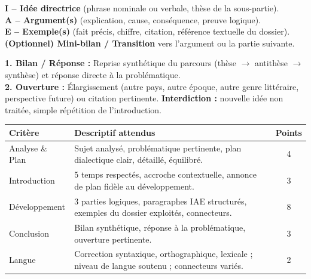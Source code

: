 \documentclass[11pt]{article}
\begin{document}
\begin{definition}
\textbf{I -- Idée directrice} (phrase nominale ou verbale, thèse de la sous-partie). \\
\textbf{A -- Argument(s)} (explication, cause, conséquence, preuve logique). \\
\textbf{E -- Exemple(s)} (fait précis, chiffre, citation, référence textuelle du dossier). \\
\textbf{(Optionnel) Mini-bilan / Transition} vers l'argument ou la partie suivante.
\end{definition}

\begin{definition}
\textbf{1. Bilan / Réponse :} Reprise synthétique du parcours (thèse $\rightarrow$ antithèse $\rightarrow$ synthèse) et réponse directe à la problématique. \\
\textbf{2. Ouverture :} Élargissement (autre pays, autre époque, autre genre littéraire, perspective future) ou citation pertinente. \textbf{Interdiction :} nouvelle idée non traitée, simple répétition de l'introduction.
\end{definition}

\begin{propriete}
\begin{center}
\begin{tabularx}{\linewidth}{|l|X|c|}\hline
\textbf{Critère} & \textbf{Descriptif attendus} & \textbf{Points} \\ \hline
Analyse \& Plan & Sujet analysé, problématique pertinente, plan dialectique clair, détaillé, équilibré. & 4 \\ \hline
Introduction & 5 temps respectés, accroche contextuelle, annonce de plan fidèle au développement. & 3 \\ \hline
Développement & 3 parties logiques, paragraphes IAE structurés, exemples du dossier exploités, connecteurs. & 8 \\ \hline
Conclusion & Bilan synthétique, réponse à la problématique, ouverture pertinente. & 3 \\ \hline
Langue & Correction syntaxique, orthographique, lexicale ; niveau de langue soutenu ; connecteurs variés. & 2 \\ \hline
\end{tabularx}
\end{center}
\end{propriete}
\end{document}
